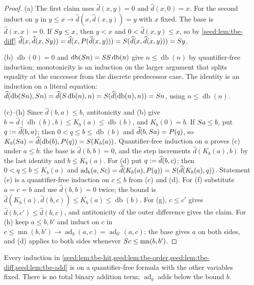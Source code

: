 \begin{proof}
(a) The first claim uses $\widehat d(x,y)=0$ and $\widehat d(x,0)=x$. For the
second induct on $y$ in $y\leq x\to\widehat d(x,\widehat d(x,y))=y$ with $x$
fixed. The base is $\widehat d(x,x)=0$. If $S y\leq x$, then $y<x$ and
$0<\widehat d(x,y)\leq x$, so by \cref{seed:lem:tbe-diff}
$\widehat d(x,\widehat d(x,S y))=\widehat d(x,P(\widehat d(x,y)))
=S(\widehat d(x,\widehat d(x,y)))=S y$.

(b) $\operatorname{db}(0)=0$ and
$\operatorname{db}(S n)=SS\operatorname{db}(n)$ give
$n\leq\operatorname{db}(n)$ by quantifier-free induction; monotonicity is an
induction on the larger argument that splits equality at the successor from
the discrete predecessor case. The identity is an induction on a literal
equation:
$\widehat d(\operatorname{db}(S n),S n)
=\widehat d(S\operatorname{db}(n),n)
=S(\widehat d(\operatorname{db}(n),n))=S n$, using
$n\leq\operatorname{db}(n)$.

(c)--(h) Since $\widehat d(b,a)\leq b$, antitonicity and (b) give
$b=\widehat d(\operatorname{db}(b),b)\leq K_b(a)\leq\operatorname{db}(b)$,
and $K_b(0)=b$. If $S a\leq b$, put $q\mathrel{:=}\widehat d(b,a)$; then
$0<q\leq b\leq\operatorname{db}(b)$ and $\widehat d(b,S a)=P(q)$, so
$K_b(S a)=\widehat d(\operatorname{db}(b),P(q))=S(K_b(a))$.
Quantifier-free induction on $a$ proves (c) under $a\leq b$: the base is
$\widehat d(b,b)=0$, and the step increments $\widehat d(K_b(a),b)$ by the
last identity and $b\leq K_b(a)$. For (d) put $q\mathrel{:=}\widehat d(b,c)$; then
$0<q\leq b\leq K_b(a)$ and
$\operatorname{ad}_b(a,S c)=\widehat d(K_b(a),P(q))
=S(\widehat d(K_b(a),q))$. Statement (e) is a quantifier-free induction
on $c\leq b$ from (c) and (d). For (f) substitute $a=c=b$ and use
$\widehat d(b,b)=0$ twice; the bound is
$\widehat d(K_b(a),\widehat d(b,c))\leq K_b(a)\leq\operatorname{db}(b)$. For
(g), $c\leq c'$ gives $\widehat d(b,c')\leq\widehat d(b,c)$, and antitonicity
of the outer difference gives the claim. For (h) keep $a\leq b,b'$ and
induct on $c$ in
$c\leq\operatorname{mn}(b,b')\to
\operatorname{ad}_b(a,c)=\operatorname{ad}_{b'}(a,c)$: the base gives $a$ on
both sides, and (d) applies to both sides whenever
$S c\leq\operatorname{mn}(b,b')$.
\end{proof}

Every induction in
\cref{seed:lem:tbe-hit,seed:lem:tbe-order,seed:lem:tbe-diff,seed:lem:tbe-add}
is on a quantifier-free formula with the other variables fixed. There is no
total binary addition term; $\operatorname{ad}_b$ adds below the bound $b$.

